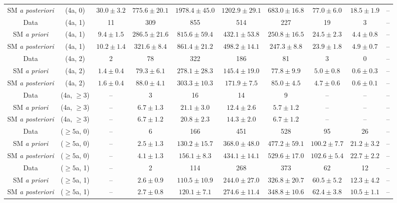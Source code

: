 \begin{table}[h!]
{\begin{tabular}{cccccccccc}
	SM \textit{a posteriori} & (4a, 0) & $30.0\pm 3.2$ & $775.6\pm 20.1$ & $1978.4\pm 45.0$ & $1202.9\pm 29.1$ & $683.0\pm 16.8$ & $77.0\pm 6.0$ & $18.5\pm 1.9$ & -- \\[0.5ex] 
	Data & (4a, 1) & 11 & 309 & 855 & 514 & 227 & 19 & 3 & -- \\[0.5ex] 
	SM \textit{a priori} & (4a, 1) & $9.4\pm 1.5$ & $286.5\pm 21.6$ & $815.6\pm 59.4$ & $432.1\pm 53.8$ & $250.8\pm 16.5$ & $24.5\pm 2.3$ & $4.4\pm 0.8$ & -- \\[0.5ex] 
	SM \textit{a posteriori} & (4a, 1) & $10.2\pm 1.4$ & $321.6\pm 8.4$ & $861.4\pm 21.2$ & $498.2\pm 14.1$ & $247.3\pm 8.8$ & $23.9\pm 1.8$ & $4.9\pm 0.7$ & -- \\[0.5ex] 
	Data & (4a, 2) & 2 & 78 & 322 & 186 & 81 & 3 & 0 & -- \\[0.5ex] 
	SM \textit{a priori} & (4a, 2) & $1.4\pm 0.4$ & $79.3\pm 6.1$ & $278.1\pm 28.3$ & $145.4\pm 19.0$ & $77.8\pm 9.9$ & $5.0\pm 0.8$ & $0.6\pm 0.3$ & -- \\[0.5ex] 
	SM \textit{a posteriori} & (4a, 2) & $1.6\pm 0.4$ & $88.0\pm 4.1$ & $303.3\pm 10.3$ & $171.9\pm 7.5$ & $85.0\pm 4.5$ & $4.7\pm 0.6$ & $0.6\pm 0.1$ & -- \\[0.5ex] 
	Data & (4a, $\ge3$) & -- & 3 & 16 & 14 & 9 & -- & -- & -- \\[0.5ex] 
	SM \textit{a priori} & (4a, $\ge3$) & -- & $6.7\pm 1.3$ & $21.1\pm 3.0$ & $12.4\pm 2.6$ & $5.7\pm 1.2$ & -- & -- & -- \\[0.5ex] 
	SM \textit{a posteriori} & (4a, $\ge3$) & -- & $6.7\pm 1.2$ & $20.8\pm 2.3$ & $14.3\pm 2.0$ & $6.7\pm 1.2$ & -- & -- & -- \\[0.5ex] 
	Data & ($\ge5$a, 0) & -- & 6 & 166 & 451 & 528 & 95 & 26 & -- \\[0.5ex] 
	SM \textit{a priori} & ($\ge5$a, 0) & -- & $2.5\pm 1.3$ & $130.2\pm 15.7$ & $368.0\pm 48.0$ & $477.2\pm 59.1$ & $100.2\pm 7.7$ & $21.2\pm 3.2$ & -- \\[0.5ex] 
	SM \textit{a posteriori} & ($\ge5$a, 0) & -- & $4.1\pm 1.3$ & $156.1\pm 8.3$ & $434.1\pm 14.1$ & $529.6\pm 17.0$ & $102.6\pm 5.4$ & $22.7\pm 2.2$ & -- \\[0.5ex] 
	Data & ($\ge5$a, 1) & -- & 2 & 114 & 268 & 373 & 62 & 12 & -- \\[0.5ex] 
	SM \textit{a priori} & ($\ge5$a, 1) & -- & $2.6\pm 0.9$ & $110.5\pm 10.9$ & $244.0\pm 27.0$ & $326.8\pm 20.7$ & $60.5\pm 5.2$ & $12.3\pm 4.2$ & -- \\[0.5ex] 
	SM \textit{a posteriori} & ($\ge5$a, 1) & -- & $2.7\pm 0.8$ & $120.1\pm 7.1$ & $274.6\pm 11.4$ & $348.8\pm 10.6$ & $62.4\pm 3.8$ & $10.5\pm 1.1$ & -- \\[0.5ex] 

\end{tabular}}
\end{table}
